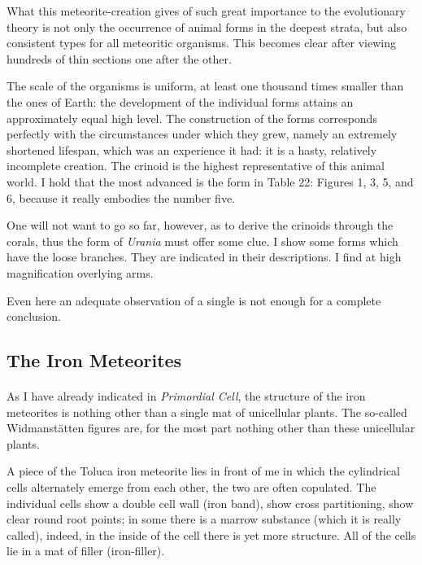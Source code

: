 \documentclass[a4paper, 12pt, oneside]{article}
\begin{document}
What this meteorite-creation gives of such great importance to the evolutionary theory is not only the occurrence of animal forms in the deepest strata, but also consistent types for all meteoritic organisms. This becomes clear after viewing hundreds of thin sections one after the other.

The scale of the organisms is uniform, at least one thousand times smaller than the ones of Earth: the development of the individual forms attains an approximately equal high level. The construction of the forms corresponds perfectly with the circumstances under which they grew, namely an extremely shortened lifespan, which was an experience it had: it is a hasty, relatively incomplete creation. The crinoid is the highest representative of this animal world. I hold that the most advanced is the form in Table 22: Figures 1, 3, 5, and 6, because it really embodies the number five.

One will not want to go so far, however, as to derive the crinoids through the corals, thus the form of \emph{Urania} must offer some clue. I show some forms which have the loose branches. They are indicated in their descriptions. I find at high magnification overlying arms.

Even here an adequate observation of a single is not enough for a complete conclusion.
\clearpage
\subsection{The Iron Meteorites}
\paragraph*{}
As I have already indicated in \emph{Primordial Cell}, the structure of the iron meteorites is nothing other than a single mat of unicellular plants. The so-called Widmanstätten figures are, for the most part nothing other than these unicellular plants.

A piece of the Toluca iron meteorite lies in front of me in which the cylindrical cells alternately emerge from each other, the two are often copulated. The individual cells show a double cell wall (iron band), show cross partitioning, show clear round root points; in some there is a marrow substance (which it is really called), indeed, in the inside of the cell there is yet more structure. All of the cells lie in a mat of filler (iron-filler).
\end{document}

